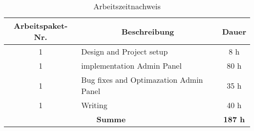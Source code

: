 \begin{table}[h!]
\centering
\begin{tabular}{|c|l|c|}
\hline
\multicolumn{1}{|c|}{\textbf{Arbeitspaket-Nr.}} &
\multicolumn{1}{c|}{\textbf{Beschreibung}}  &
\multicolumn{1}{c|}{\textbf{Dauer}}  \\ \hline
  1 & Design and Project setup & 8 h \\ \hline
  1 & implementation Admin Panel & 80 h \\ \hline
  1 & Bug fixes and Optimazation Admin Panel & 35 h \\ \hline
  1 & Writing & 40 h \\ \hline



  
  \multicolumn{2}{|c|}{\textbf{Summe}} & \textbf{187 h} \\ \hline
 \end{tabular}
\caption{Arbeitszeitnachweis}
\end{table}

\newpage




 